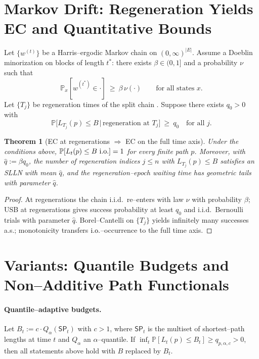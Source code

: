 \documentclass[11pt]{article}
\theoremstyle{plain}
\newtheorem{theorem}{Theorem}
\theoremstyle{definition}
\newcommand{\Prb}{\mathbb{P}}
\newcommand{\io}{\text{\rm i.o.}}
\begin{document}
\section{Markov Drift: Regeneration Yields EC and Quantitative Bounds}
Let $\{w^{(t)}\}$ be a Harris–ergodic Markov chain on \((0,\infty)^{|E|}\). Assume a Doeblin minorization on blocks of length $t^\ast$: there exists $\beta\in(0,1]$ and a probability $\nu$ such that
\[
\Prb_x[w^{(t^\ast)}\in \cdot]\ \ge\ \beta\,\nu(\cdot)\qquad \text{for all states }x.
\]
Let $\{T_j\}$ be regeneration times of the split chain \cite[Ch.~10]{MeynTweedie}. Suppose there exists $q_0>0$ with
\[
\Prb\big[L_{T_j}(p)\le B \,\big|\, \text{regeneration at }T_j\big]\ \ge\ q_0 \quad \text{for all }j.
\]

\begin{theorem}[EC at regenerations $\Rightarrow$ EC on the full time axis]\label{thm:regen}
Under the conditions above, $\Prb[L_t(p)\le B~\io]=1$ for every finite path $p$. Moreover, with $\hat q:=\beta q_0$, the number of regeneration indices $j\le n$ with $L_{T_j}(p)\le B$ satisfies an SLLN with mean $\hat q$, and the regeneration–epoch waiting time has geometric tails with parameter $\hat q$.
\end{theorem}

\begin{proof}
At regenerations the chain i.i.d.\ re–enters with law $\nu$ with probability $\beta$; USB at regenerations gives success probability at least $q_0$ and i.i.d.\ Bernoulli trials with parameter $\hat q$. Borel–Cantelli on $\{T_j\}$ yields infinitely many successes a.s.; monotonicity transfers $\io$–occurrence to the full time axis.
\end{proof}

\section{Variants: Quantile Budgets and Non–Additive Path Functionals}
\paragraph{Quantile–adaptive budgets.}
Let $B_t:=c\cdot Q_\alpha(\mathsf{SP}_t)$ with $c>1$, where $\mathsf{SP}_t$ is the multiset of shortest–path lengths at time $t$ and $Q_\alpha$ an $\alpha$–quantile. If $\inf_t \Prb[L_t(p)\le B_t]\ge q_{p,\alpha,c}>0$, then all statements above hold with $B$ replaced by $B_t$.
\end{document}
